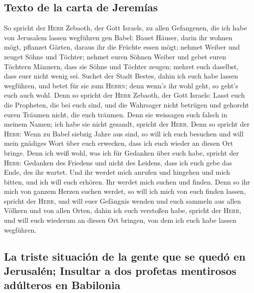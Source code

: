 \hypertarget{texto-de-la-carta-de-jeremuxedas}{%
\subsection{Texto de la carta de
Jeremías}\label{texto-de-la-carta-de-jeremuxedas}}

 So spricht der \textsc{Herr} Zebaoth, der Gott Israels,
zu allen Gefangenen, die ich habe von Jerusalem lassen wegführen gen
Babel:  Bauet Häuser, darin ihr wohnen mögt, pflanzet
Gärten, daraus ihr die Früchte essen mögt;  nehmet Weiber
und zeuget Söhne und Töchter; nehmet euren Söhnen Weiber und gebet euren
Töchtern Männern, dass sie Söhne und Töchter zeugen; mehret euch
daselbst, dass euer nicht wenig sei.  Suchet der Stadt
Bestes, dahin ich euch habe lassen wegführen, und betet für sie zum
\textsc{Herrn}; denn wenn's ihr wohl geht, so geht's euch auch wohl.
 Denn so spricht der \textsc{Herr} Zebaoth, der Gott
Israels: Lasst euch die Propheten, die bei euch sind, und die Wahrsager
nicht betrügen und gehorcht euren Träumen nicht, die euch träumen.
 Denn sie weissagen euch falsch in meinem Namen; ich habe
sie nicht gesandt, spricht der \textsc{Herr}.  Denn so
spricht der \textsc{Herr}: Wenn zu Babel siebzig Jahre aus sind, so will
ich euch besuchen und will mein gnädiges Wort über euch erwecken, dass
ich euch wieder an diesen Ort bringe.  Denn ich weiß
wohl, was ich für Gedanken über euch habe, spricht der \textsc{Herr}:
Gedanken des Friedens und nicht des Leidens, dass ich euch gebe das
Ende, des ihr wartet.  Und ihr werdet mich anrufen und
hingehen und mich bitten, und ich will euch erhören.  Ihr
werdet mich suchen und finden. Denn so ihr mich von ganzem Herzen suchen
werdet,  so will ich mich von euch finden lassen, spricht
der \textsc{Herr}, und will euer Gefängnis wenden und euch sammeln aus
allen Völkern und von allen Orten, dahin ich euch verstoßen habe,
spricht der \textsc{Herr}, und will euch wiederum an diesen Ort bringen,
von dem ich euch habe lassen wegführen.

\hypertarget{la-triste-situaciuxf3n-de-la-gente-que-se-queduxf3-en-jerusaluxe9n-insultar-a-dos-profetas-mentirosos-aduxfalteros-en-babilonia}{%
\subsection{La triste situación de la gente que se quedó en Jerusalén;
Insultar a dos profetas mentirosos adúlteros en
Babilonia}\label{la-triste-situaciuxf3n-de-la-gente-que-se-queduxf3-en-jerusaluxe9n-insultar-a-dos-profetas-mentirosos-aduxfalteros-en-babilonia}}

